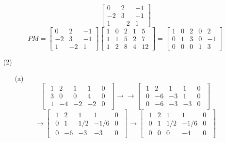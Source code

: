 \documentclass[12pt]{article}
\begin{document}
\begin{itemize}
\begin{itemize}
$$\begin{bmatrix}
0 & 2 & -1 \\
-2 & 3 & -1 \\
1 & -2 & 1
\end{bmatrix}$$
$$PM = \begin{bmatrix}
0 & 2 & -1 \\
-2 & 3 & -1 \\
1 & -2 & 1
\end{bmatrix}\begin{bmatrix}
1 & 0 & 2 & 1 & 5 \\
1 & 1 & 5 & 2 & 7 \\
1 & 2 & 8 & 4 & 12
\end{bmatrix} = \begin{bmatrix}
1 & 0 & 2 & 0 & 2 \\
0 & 1 & 3 & 0 & -1 \\
0 & 0 & 0 & 1 & 3
\end{bmatrix}$$
\end{itemize}
\item[(2)]
\begin{itemize}
\item[(a)]
$$\begin{bmatrix}
\begin{array}{cccc|c}
1 & 2 & 1 & 1 & 0 \\
3 & 0 & 0 & 4 & 0 \\
1 & -4 & -2 & -2 & 0
\end{array}
\end{bmatrix} \rightarrow\rightarrow \begin{bmatrix}
\begin{array}{cccc|c}
1 & 2 & 1 & 1 & 0 \\
0 & -6 & -3 & 1 & 0 \\
0 & -6 & -3 & -3 & 0
\end{array}
\end{bmatrix}$$
$$ \rightarrow \begin{bmatrix}
\begin{array}{cccc|c}
1 & 2 & 1 & 1 & 0 \\
0 & 1 & 1/2 & -1/6 & 0 \\
0 & -6 & -3 & -3 & 0
\end{array}
\end{bmatrix} \rightarrow \begin{bmatrix}
\begin{array}{cccc|c}
1 & 2 & 1 & 1 & 0 \\
0 & 1 & 1/2 & -1/6 & 0 \\
0 & 0 & 0 & -4 & 0
\end{array}

\end{bmatrix}$$
\end{itemize}
\end{itemize}
\end{document}
